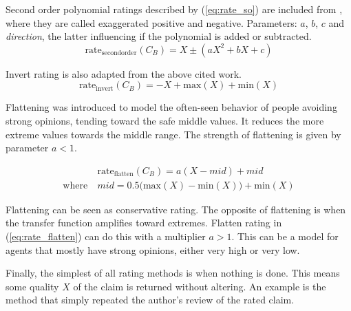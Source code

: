 \documentclass[%
    ]{\PathToTumTemplate/thesis/tum_thesis}
\begin{document}
Second order polynomial ratings described by (\ref{eq:rate_so}) are included from \cite{yu_detecting_2003}, where they are called exaggerated positive and negative.
Parameters: $a$, $b$, $c$ and \emph{direction}, the latter influencing if the polynomial is added or subtracted.
\begin{equation}\label{eq:rate_so}
\mathrm{rate_{second order}}(C_B) = X \pm (aX^2+bX+c)
\end{equation}

Invert rating is also adapted from the above cited work.
\begin{equation}\label{eq:rate_invert}
\mathrm{rate_{invert}}(C_B) = -X + \mathrm{max}(X) + \mathrm{min}(X)
\end{equation}

Flattening was introduced to model the often-seen behavior of people avoiding strong opinions, tending toward the safe middle values.
It reduces the more extreme values towards the middle range.
The strength of flattening is given by parameter $a < 1$.

\begin{equation}\label{eq:rate_flatten}
\begin{aligned}
&\mathrm{rate_{flatten}}(C_B) = a(X-mid)+mid \\
\mathrm{where~}&mid = 0.5\big(\mathrm{max}(X) - \mathrm{min}(X) \big) + \mathrm{min}(X)
\end{aligned}
\end{equation}

Flattening can be seen as conservative rating.
The opposite of flattening is when the transfer function amplifies toward extremes.
Flatten rating in (\ref{eq:rate_flatten}) can do this with a multiplier $a > 1$.
This can be a model for agents that mostly have strong opinions, either very high or very low.

Finally, the simplest of all rating methods is when nothing is done.
This means some quality $X$ of the claim is returned without altering.
An example is the method that simply repeated the author's review of the rated claim.
\end{document}
